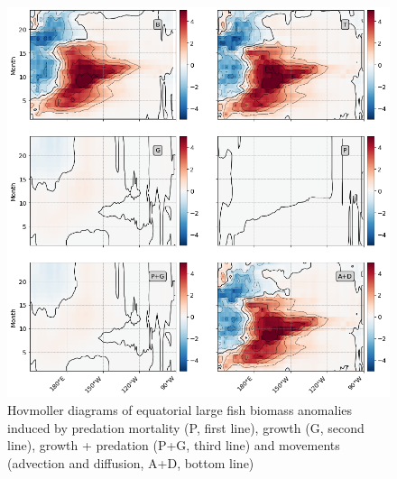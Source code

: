 \begin{figure}[h!tp]
	\centering
	\includegraphics[scale=0.4]{figs/hov_compo_l_90.png}	
	\caption{Hovmoller diagrams of equatorial large fish biomass anomalies induced by predation mortality (P, first line), growth (G, second line), growth + predation (P+G, third line) and movements (advection and diffusion, A+D, bottom line)}	
	\label{fig:hov_ape_trends_90}
\end{figure}



